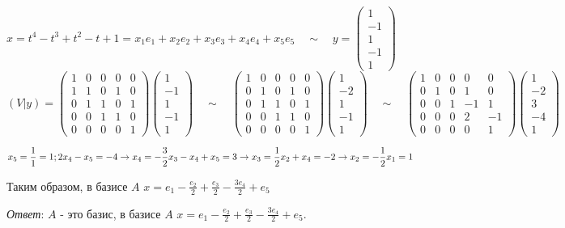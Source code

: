 \begin{enumerate}
    $x = t^4 - t^3 + t^2 - t + 1 = x_1 e_1 + x_2 e_2 + x_3 e_3 + x_4 e_4 + x_5 e_5 \quad\sim\quad y = \begin{pmatrix}1 \\ -1 \\ 1 \\ -1 \\ 1\end{pmatrix}$\\
    $(V|y) = \begin{pmatrix}1 & 0 & 0 & 0 & 0 \\ 1 & 1 & 0 & 1 & 0 \\ 0 & 1 & 1 & 0 & 1 \\ 0 & 0 & 1 & 1 & 0 \\ 0 & 0 & 0 & 0 & 1\end{pmatrix}\begin{pmatrix}1 \\ -1 \\ 1 \\ -1 \\ 1\end{pmatrix}
    \quad\sim\quad
    \begin{pmatrix}1 & 0 & 0 & 0 & 0 \\ 0 & 1 & 0 & 1 & 0 \\ 0 & 1 & 1 & 0 & 1 \\ 0 & 0 & 1 & 1 & 0 \\ 0 & 0 & 0 & 0 & 1\end{pmatrix}\begin{pmatrix}1 \\ -2 \\ 1 \\ -1 \\ 1\end{pmatrix}
    \quad\sim\quad
    \begin{pmatrix}1 & 0 & 0 & 0 & 0 \\ 0 & 1 & 0 & 1 & 0 \\ 0 & 0 & 1 & -1 & 1 \\ 0 & 0 & 0 & 2 & -1 \\ 0 & 0 & 0 & 0 & 1\end{pmatrix}\begin{pmatrix}1 \\ -2 \\ 3 \\ -4 \\ 1\end{pmatrix}$

    $\displaystyle x_5 = \frac{1}{1} = 1;\\
    2x_4 - x_5 = -4 \implies x_4 = -\frac{3}{2}\\
    x_3 - x_4 + x_5 = 3 \implies x_3 = \frac{1}{2}\\
    x_2 + x_4 = -2 \implies x_2 = -\frac{1}{2}\\
    x_1 = 1$

    Таким образом, в базисе $A$ $\displaystyle x = e_1 - \frac{e_2}{2} + \frac{e_3}{2} - \frac{3e_4}{2} + e_5$

    \textit{Ответ}: $A$ - это базис, в базисе $A$ $\displaystyle x = e_1 - \frac{e_2}{2} + \frac{e_3}{2} - \frac{3e_4}{2} + e_5$.
\end{enumerate}

\clearpage
